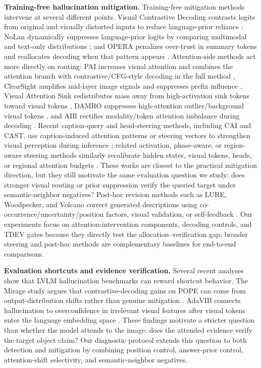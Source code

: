 \noindent\textbf{Training-free hallucination mitigation.}
Training-free mitigation methods intervene at several different points. Visual Contrastive Decoding contrasts logits from original and visually distorted inputs to reduce language-prior reliance \cite{leng2023vcd}; NoLan dynamically suppresses language-prior logits by comparing multimodal and text-only distributions \cite{ren2026nolan}; and OPERA penalizes over-trust in summary tokens and reallocates decoding when that pattern appears \cite{huang2023opera}. Attention-side methods act more directly on routing: PAI increases visual attention and combines the attention branch with contrastive/CFG-style decoding in the full method \cite{liu2024pai}, ClearSight amplifies mid-layer image signals and suppresses prefix influence \cite{yin2025clearsight}, Visual Attention Sink redistributes mass away from high-activation sink tokens toward visual tokens \cite{kang2025visualsink}, DAMRO suppresses high-attention outlier/background visual tokens \cite{gong2024damro}, and AIR rectifies modality/token attention imbalance during decoding \cite{sun2026air}. Recent caption-query and head-steering methods, including CAI and CAST, use caption-induced attention patterns or steering vectors to strengthen visual perception during inference \cite{li2025cai,li2026cast}; related activation, phase-aware, or region-aware steering methods similarly recalibrate hidden states, visual tokens, heads, or regional attention budgets \cite{yin2026dynamic,kim2026focus,xu2026regionaware}. These works are closest to the practical mitigation direction, but they still motivate the same evaluation question we study: does stronger visual routing or prior suppression verify the queried target under semantic-neighbor negatives? Post-hoc revision methods such as LURE, Woodpecker, and Volcano correct generated descriptions using co-occurrence/uncertainty/position factors, visual validation, or self-feedback \cite{zhou2023lure,yin2023woodpecker,lee2023volcano}. Our experiments focus on attention-intervention components, decoding controls, and TDEV gates because they directly test the allocation--verification gap; broader steering and post-hoc methods are complementary baselines for end-to-end comparisons.

\noindent\textbf{Evaluation shortcuts and evidence verification.}
Several recent analyses show that LVLM hallucination benchmarks can reward shortcut behavior. The Mirage study argues that contrastive-decoding gains on POPE can come from output-distribution shifts rather than genuine mitigation \cite{yin2025mirage}. AdaVIB connects hallucination to overconfidence in irrelevant visual features after visual tokens enter the language embedding space \cite{bai2025adavib}. These findings motivate a stricter question than whether the model attends to the image: does the attended evidence verify the target object claim? Our diagnostic protocol extends this question to both detection and mitigation by combining position control, answer-prior control, attention-shift selectivity, and semantic-neighbor negatives.


